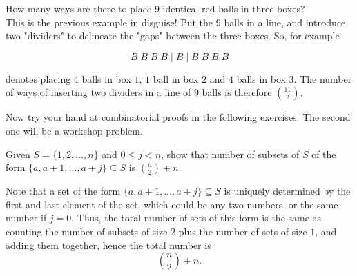 \documentclass[11pt,dvipsnames]{book}
\numberwithin{equation}{section} %
\numberwithin{figure}{section} %
\numberwithin{table}{section} %
\begin{document}
\begin{example}\label{identicalballsinboxes}
How many ways are there to place $9$ identical red balls in three boxes? \\

This is the previous example in disguise! Put the 
$9$ balls in a line, and introduce two "dividers" 
to delineate the "gaps" between the three boxes.
So, for example

$$ B\;B\;B\;B\; |\; B\; |\; B\; B\;B\;B$$

\noindent
denotes placing $4$ balls in box $1$, $1$ ball in box $2$ and $4$ balls in box 3. The number of ways of inserting two dividers in a line of $9$ balls is therefore ${11\choose 2}$.

\end{example}
%
%
%
%
%

Now try your hand at combinatorial proofs in the following exercises. The second one will be a workshop problem.


\begin{exercise}
Given $S=\{1,2, \dots ,n\}$ and $0\leq j<n$, show that number of subsets of $S$ of the form $\{a,a+1, \dots ,a+j\}\subseteq S$ is ${n\choose 2} + n$.
\begin{solution}
Note that a set of the form $\{a,a+1, \dots ,a+j\}\subseteq S$ is uniquely determined by the first and last element of the set, which could be any two numbers, or the same number if $j=0$. Thus, the total number of sets of this form is the same as counting the number of subsets of size $2$ plus the number of sets of size $1$, and adding them together, hence the total number is 
\[
{n\choose 2} + n.
\]
\end{solution}
\end{exercise}
\end{document}
